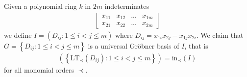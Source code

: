 \documentclass[a4paper, 11pt]{article}
\begin{document}
\begin{eg}
Given a polynomial ring \( k \) in \( 2m \) indeterminates
\begin{align*}
  \begin{bmatrix}
    x_{11} & x_{12} & ... & x_{1m} \\
    x_{21} & x_{22} & ... & x_{2m}
  \end{bmatrix}
\end{align*}
we define \( I = (D_{ij} : 1 \leq i < j \leq m) \) where \( D_{ij} = x_{1i}x_{2j} - x_{1j}x_{2i} \). We claim that \( G = \left\{ D_{ij} : 1 \leq i < j \leq m \right\} \) is a universal Gröbner basis of \( I \), that is 
\begin{align*}
(\left\{  \mathrm{LT}_\prec(D_{ij}) : 1 \leq i < j \leq m \right\}) = \mathrm{in}_\prec(I)
\end{align*}
for all monomial orders \( \prec \).


\end{eg}
\end{document}
